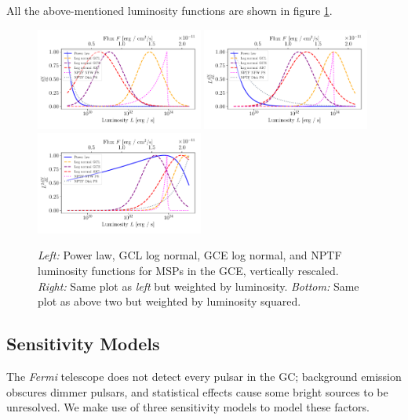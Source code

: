 \documentclass[a4paper,11pt]{article}
\begin{document}
All the above-mentioned luminosity functions are shown in figure \ref{fig:lum-funcs}.

\begin{figure}
    \centering
    \includegraphics[width=0.49\textwidth]{figs/lum-funcs.pdf}
    \includegraphics[width=0.49\textwidth]{figs/l-lum-funcs.pdf}
    \includegraphics[width=0.49\textwidth]{figs/l2-lum-funcs.pdf}
    \caption{\textit{Left:} Power law, GCL log normal, GCE log normal, and NPTF luminosity functions for MSPs in the GCE, vertically rescaled. \textit{Right:} Same plot as \textit{left} but weighted by luminosity. \textit{Bottom:} Same plot as above two but weighted by luminosity squared.}
    \label{fig:lum-funcs}
\end{figure}


\subsection{Sensitivity Models}
\label{sec:sensitivity}
The \textit{Fermi} telescope does not detect every pulsar in the GC; background emission obscures dimmer pulsars, and statistical effects cause some bright sources to be unresolved. We make use of three sensitivity models to model these factors.
\end{document}
